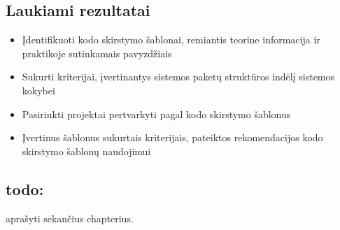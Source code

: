 \subsection{Laukiami rezultatai}
\begin{itemize}
    \item Įdentifikuoti kodo skirstymo šablonai, remiantis teorine informacija ir praktikoje sutinkamais pavyzdžiais
    \item Sukurti kriterijai, įvertinantys sistemos paketų struktūros indėlį sistemos kokybei
    \item Pasirinkti projektai pertvarkyti pagal kodo skirstymo šablonus
    \item Įvertinus šablonus sukurtais kriterijais, pateiktos rekomendacijos kodo skirstymo šablonų naudojimui
\end{itemize}


\subsection{todo:}
aprašyti sekančius chapterius.
